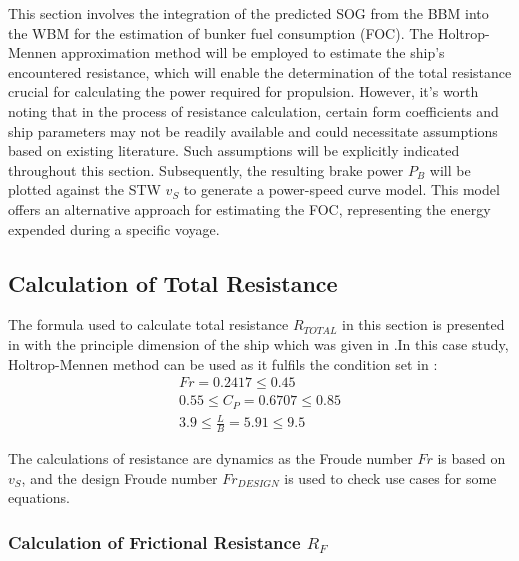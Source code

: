 This section involves the integration of the predicted SOG from the BBM into the WBM for the estimation of bunker fuel consumption (FOC). The Holtrop-Mennen approximation method will be employed to estimate the ship's encountered resistance, which will enable the determination of the total resistance crucial for calculating the power required for propulsion. However, it's worth noting that in the process of resistance calculation, certain form coefficients and ship parameters may not be readily available and could necessitate assumptions based on existing literature. Such assumptions will be explicitly indicated throughout this section. Subsequently, the resulting brake power $P_B$ will be plotted against the STW $v_S$ to generate a power-speed curve model. This model offers an alternative approach for estimating the FOC, representing the energy expended during a specific voyage.

\subsection{Calculation of Total Resistance}\label{sec:Rtot_calc_method}

The formula used to calculate total resistance $R_{TOTAL}$ in this section is presented in  with the principle dimension of the ship which was given in .In this case study, Holtrop-Mennen method can be used as it fulfils the condition set in :
\begin{equation}
    \label{eqn:holtrop_cond_fulfill}
    \begin{gathered}
        Fr = 0.2417  \leqslant 0.45 \\
        0.55 \leqslant C_P = 0.6707 \leqslant 0.85 \\
        3.9 \leqslant \frac{L}{B} = 5.91 \leqslant 9.5
    \end{gathered}
\end{equation}

The calculations of resistance are dynamics as the Froude number $Fr$ is based on $v_S$, and the design Froude number $Fr_{DESIGN}$ is used to check use cases for some equations.

\subsubsection*{Calculation of Frictional Resistance $R_F$}

